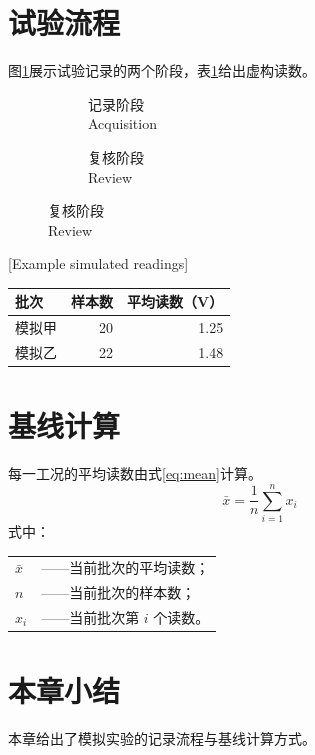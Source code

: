 \documentclass{sdjumthesis}
\begin{document}
\section{试验流程}
图\ref{fig:flow}展示试验记录的两个阶段，表\ref{tab:readings}给出虚构读数。
\begin{figure}[htbp]
\centering\ThesisTableFont
\begin{subfigure}{.42\linewidth}
\centering{}
\caption{记录阶段\\Acquisition}
\end{subfigure}\qquad
\begin{subfigure}{.42\linewidth}
\centering{}
\caption{复核阶段\\Review}
\end{subfigure}
\label{fig:flow}
\end{figure}

\begin{table}[htbp]
\centering
{}[Example simulated readings]
\label{tab:readings}
\ThesisTableFont
\begin{tabular}{lrr}
\toprule
批次 & 样本数 & 平均读数（V）\\
\midrule
模拟甲 & 20 & 1.25\\
模拟乙 & 22 & 1.48\\
\bottomrule
\end{tabular}
\end{table}

\section{基线计算}
每一工况的平均读数由式\eqref{eq:mean}计算。
\begin{equation}
  \bar{x}=\frac{1}{n}\sum_{i=1}^{n}x_i
  \label{eq:mean}
\end{equation}
式中：\par
\noindent\hspace{2em}\begin{tabular}{@{}l@{\quad}l@{}}
$\bar{x}$ & ——当前批次的平均读数；\\
$n$ & ——当前批次的样本数；\\
$x_i$ & ——当前批次第 $i$ 个读数。
\end{tabular}

\section{本章小结}
本章给出了模拟实验的记录流程与基线计算方式。
\end{document}
